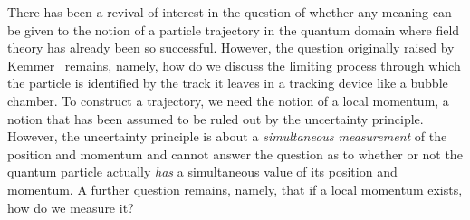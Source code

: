 \documentclass[12pt]{article}%
\begin{document}


There has been a revival of interest in the question of whether any meaning
can be given to the notion of a particle trajectory in the quantum domain
where field theory has already been so successful. However, the question
originally raised by Kemmer~\cite{nk39} remains, namely, how do we
discuss the limiting process through which the particle is identified by the
track it leaves in a tracking device like a bubble chamber. To construct a
trajectory, we need the notion of a local momentum, a notion that has been
assumed to be ruled out by the uncertainty principle. However, the uncertainty
principle is about a \emph{simultaneous measurement} of the position and
momentum and cannot answer the question as to whether or not the quantum
particle actually \emph{has} a simultaneous value of its position and
momentum. A further question remains, namely, that if a local momentum exists,
how do we measure it?
\end{document}

